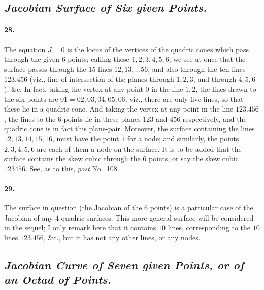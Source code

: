 \documentclass[11pt,a4paper]{article}
\begin{document}
\subsection*{\textit{Jacobian Surface of Six given Points.}}

\paragraph{28.}
The equation $J = 0$ is the locus of the vertices of the quadric cones which pass through
the given $6$ points; calling these $1, 2, 3, 4, 5, 6$, we see at once that the surface
passes through the $15$ lines $12, 13, \ldots 56$, and also through the ten lines
$123.456$ (viz., line of intersection of the planes through $1, 2, 3$, and through
$4, 5, 6$), \&c. In fact, taking the vertex at any point $0$ in the line $1, 2$, the lines
drawn to the six points are $01 = 02, 03, 04, 05, 06$; viz., there are only five lines, so
that these lie in a quadric cone. And taking the vertex at any point in the line $123.456$,
the lines to the $6$ points lie in these planes $123$ and $456$ respectively, and the
quadric cone is in fact this plane-pair. Moreover, the surface containing the lines
$12, 13, 14, 15, 16$, must have the point $1$ for a node; and similarly, the points
$2, 3, 4, 5, 6$ are each of them a node on the surface. It is to be added that the surface
contains the skew cubic through the $6$ points, or say the skew cubic $123456$. See, as to
this, \textit{post} No.\ 108.

\paragraph{29.}
The surface in question (the Jacobian of the $6$ points) is a particular case of the
Jacobian of any $4$ quadric surfaces. This more general surface will be considered in the
sequel; I only remark here that it contains $10$ lines, corresponding to the $10$ lines
$123.456$, \&c., but it has not any other lines, or any nodes.

\subsection*{\textit{Jacobian Curve of Seven given Points, or of an Octad of Points.}}
\end{document}

